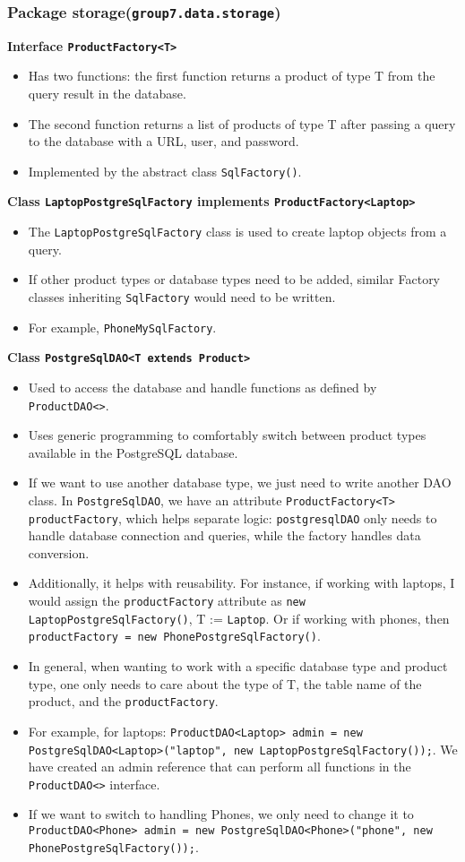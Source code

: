 \documentclass{article}
\begin{document}
\subsubsection{Package storage(\texttt{group7.data.storage})}
\textbf{Interface \texttt{ProductFactory<T>}}
\begin{itemize}
    \item Has two functions: the first function returns a product of type T from the query result in the database.
    \item The second function returns a list of products of type T after passing a query to the database with a URL, user, and password.
    \item Implemented by the abstract class \texttt{SqlFactory()}.
\end{itemize}
\textbf{Class \texttt{LaptopPostgreSqlFactory} implements \texttt{ProductFactory<Laptop>}}
\begin{itemize}
    \item The \texttt{LaptopPostgreSqlFactory} class is used to create laptop objects from a query.
    \item If other product types or database types need to be added, similar Factory classes inheriting \texttt{SqlFactory} would need to be written.
    \item For example, \texttt{PhoneMySqlFactory}.
\end{itemize}
\textbf{Class \texttt{PostgreSqlDAO<T extends Product>}}
\begin{itemize}
    \item Used to access the database and handle functions as defined by \texttt{ProductDAO<>}.
    \item Uses generic programming to comfortably switch between product types available in the PostgreSQL database.
    \item If we want to use another database type, we just need to write another DAO class. In \texttt{PostgreSqlDAO}, we have an attribute \texttt{ProductFactory<T> productFactory}, which helps separate logic: \texttt{postgresqlDAO} only needs to handle database connection and queries, while the factory handles data conversion.
    \item Additionally, it helps with reusability. For instance, if working with laptops, I would assign the \texttt{productFactory} attribute as \texttt{new LaptopPostgreSqlFactory()}, T := \texttt{Laptop}. Or if working with phones, then \texttt{productFactory = new PhonePostgreSqlFactory()}.
    \item In general, when wanting to work with a specific database type and product type, one only needs to care about the type of T, the table name of the product, and the \texttt{productFactory}.
    \item For example, for laptops: \texttt{ProductDAO<Laptop> admin = new PostgreSqlDAO<Laptop>("laptop", new LaptopPostgreSqlFactory());}. We have created an admin reference that can perform all functions in the \texttt{ProductDAO<>} interface.
    \item If we want to switch to handling Phones, we only need to change it to \texttt{ProductDAO<Phone> admin = new PostgreSqlDAO<Phone>("phone", new PhonePostgreSqlFactory());}.
\end{itemize}
\end{document}
